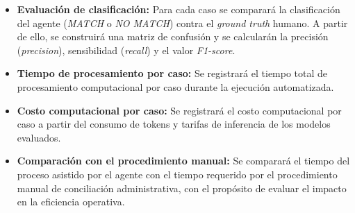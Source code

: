 \begin{itemize}
    \item \textbf{Evaluación de clasificación:} Para cada caso se comparará la clasificación del agente (\textit{MATCH} o \textit{NO MATCH}) contra el \textit{ground truth} humano. A partir de ello, se construirá una matriz de confusión y se calcularán la precisión (\textit{precision}), sensibilidad (\textit{recall}) y el valor \textit{F1-score}.
    \item \textbf{Tiempo de procesamiento por caso:} Se registrará el tiempo total de procesamiento computacional por caso durante la ejecución automatizada.
    \item \textbf{Costo computacional por caso:} Se registrará el costo computacional por caso a partir del consumo de tokens y tarifas de inferencia de los modelos evaluados.
    \item \textbf{Comparación con el procedimiento manual:} Se comparará el tiempo del proceso asistido por el agente con el tiempo requerido por el procedimiento manual de conciliación administrativa, con el propósito de evaluar el impacto en la eficiencia operativa.
\end{itemize}
